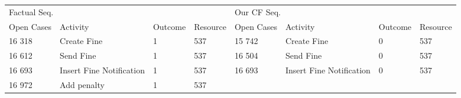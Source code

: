 \begin{tabular}{llllllll}
\toprule
\multicolumn{4}{l}{Factual Seq.} & \multicolumn{4}{l}{Our CF Seq.} \\
Open Cases & Activity & Outcome & Resource & Open Cases & Activity & Outcome & Resource \\
\midrule
16 318 & Create Fine & 1 & 537 & 15 742 & Create Fine & 0 & 537 \\
16 612 & Send Fine & 1 & 537 & 16 504 & Send Fine & 0 & 537 \\
16 693 & Insert Fine Notification & 1 & 537 & 16 693 & Insert Fine Notification & 0 & 537 \\
16 972 & Add penalty & 1 & 537 &  &  &  &  \\
\bottomrule
\end{tabular}
